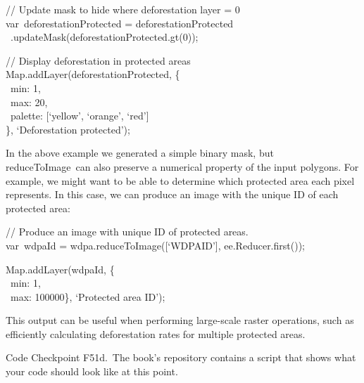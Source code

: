 \documentclass[
  letterpaper,
  DIV=11,
  numbers=noendperiod]{scrreprt}
\begin{document}
// Update mask to hide where deforestation layer = 0\\
var~deforestationProtected = deforestationProtected\\
\hspace*{0.333em} ~.updateMask(deforestationProtected.gt(0));

// Display deforestation in protected areas\\
Map.addLayer(deforestationProtected, \{\\
\hspace*{0.333em} ~min: 1,\\
\hspace*{0.333em} ~max: 20,\\
\hspace*{0.333em} ~palette: {[}`yellow', `orange', `red'{]}\\
\}, `Deforestation protected');

In the above example we generated a simple binary mask, but
reduceToImage~can also preserve a numerical property of the input
polygons. For example, we might want to be able to determine which
protected area each pixel represents. In this case, we can produce an
image with the unique ID of each protected area:

// Produce an image with unique ID of protected areas.\\
var~wdpaId = wdpa.reduceToImage({[}`WDPAID'{]}, ee.Reducer.first());

Map.addLayer(wdpaId, \{\\
\hspace*{0.333em} ~min: 1,\\
\hspace*{0.333em} ~max: 100000\}, `Protected area ID');

This output can be useful when performing large-scale raster operations,
such as efficiently calculating deforestation rates for multiple
protected areas.

\begin{tcolorbox}[enhanced jigsaw, left=2mm, breakable, rightrule=.15mm, opacityback=0, colframe=quarto-callout-note-color-frame, colbacktitle=quarto-callout-note-color!10!white, arc=.35mm, opacitybacktitle=0.6, toptitle=1mm, colback=white, leftrule=.75mm, title=\textcolor{quarto-callout-note-color}{\faInfo}\hspace{0.5em}{Note}, toprule=.15mm, bottomtitle=1mm, titlerule=0mm, bottomrule=.15mm, coltitle=black]

Code Checkpoint F51d.~The book's repository contains a script that shows
what your code should look like at this point.

\end{tcolorbox}
\end{document}
